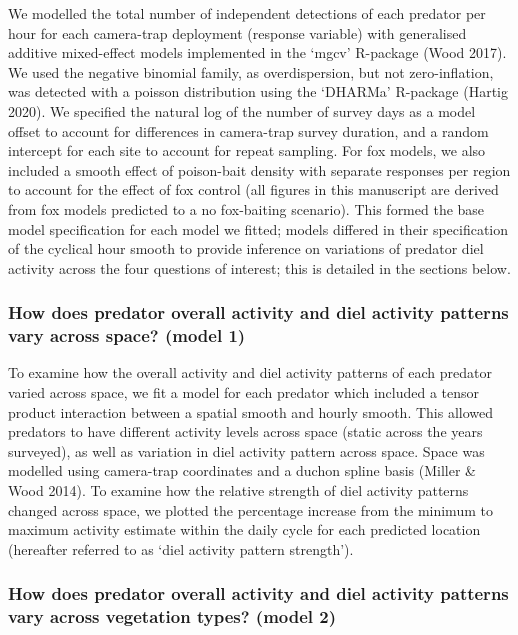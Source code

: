 \documentclass[11pt,a4paper,titlepage,twoside,openright]{style/unimelbthesis}
\begin{document}
\begin{mainmatter}
We modelled the total number of independent detections of each predator per hour for each camera-trap deployment (response variable) with generalised additive mixed-effect models implemented in the `mgcv' R-package (Wood 2017). We used the negative binomial family, as overdispersion, but not zero-inflation, was detected with a poisson distribution using the `DHARMa' R-package (Hartig 2020). We specified the natural log of the number of survey days as a model offset to account for differences in camera-trap survey duration, and a random intercept for each site to account for repeat sampling. For fox models, we also included a smooth effect of poison-bait density with separate responses per region to account for the effect of fox control (all figures in this manuscript are derived from fox models predicted to a no fox-baiting scenario). This formed the base model specification for each model we fitted; models differed in their specification of the cyclical hour smooth to provide inference on variations of predator diel activity across the four questions of interest; this is detailed in the sections below.

\hypertarget{how-does-predator-overall-activity-and-diel-activity-patterns-vary-across-space-model-1}{%
\subsubsection{How does predator overall activity and diel activity patterns vary across space? (model 1)}\label{how-does-predator-overall-activity-and-diel-activity-patterns-vary-across-space-model-1}}

To examine how the overall activity and diel activity patterns of each predator varied across space, we fit a model for each predator which included a tensor product interaction between a spatial smooth and hourly smooth. This allowed predators to have different activity levels across space (static across the years surveyed), as well as variation in diel activity pattern across space. Space was modelled using camera-trap coordinates and a duchon spline basis (Miller \& Wood 2014). To examine how the relative strength of diel activity patterns changed across space, we plotted the percentage increase from the minimum to maximum activity estimate within the daily cycle for each predicted location (hereafter referred to as `diel activity pattern strength').

\hypertarget{how-does-predator-overall-activity-and-diel-activity-patterns-vary-across-vegetation-types-model-2}{%
\subsubsection{How does predator overall activity and diel activity patterns vary across vegetation types? (model 2)}\label{how-does-predator-overall-activity-and-diel-activity-patterns-vary-across-vegetation-types-model-2}}


\end{mainmatter}
\end{document}
